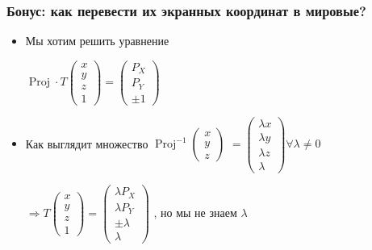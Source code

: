 \documentclass[10pt]{beamer}
\begin{document}
\begin{frame}[fragile]
\frametitle{Бонус: как перевести их экранных координат в мировые?}
\begin{itemize}
\item Мы хотим решить уравнение
\begin{center}
\begin{math}
\operatorname{Proj}\cdot T \begin{pmatrix}x \\ y \\ z \\ 1\end{pmatrix} = \begin{pmatrix}P_X \\ P_Y \\ \pm 1\end{pmatrix}
\end{math}
\end{center}
\pause
\item Как выглядит множество \begin{math}\operatorname{Proj}^{-1} \begin{pmatrix}x \\ y \\ z\end{pmatrix}\end{math} \pause \begin{math}=\begin{pmatrix}\lambda x \\ \lambda y \\ \lambda z \\ \lambda \end{pmatrix} \forall \lambda  \neq 0\end{math}
\pause
\begin{center}
\begin{math}
\Rightarrow T \begin{pmatrix}x \\ y \\ z \\ 1\end{pmatrix} = \begin{pmatrix}\lambda P_X \\ \lambda P_Y \\ \pm \lambda \\ \lambda\end{pmatrix}
\end{math}
, но мы не знаем \begin{math}\lambda\end{math}
\end{center}
\end{itemize}
\end{frame}
\end{document}
